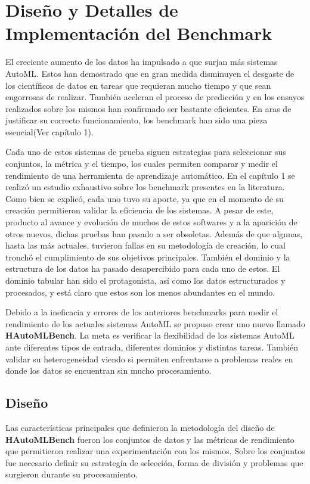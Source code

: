 \chapter{Diseño y Detalles de Implementación del Benchmark}\label{chapter:design}
El creciente aumento de los datos ha impulsado a que surjan más sistemas AutoML. Estos han demostrado que en gran medida disminuyen 
el desgaste de los científicos de datos en tareas que requieran mucho tiempo y que sean engorrosas de realizar. También aceleran 
el proceso de predicción y en los ensayos realizados sobre los mismos han confirmado ser bastante eficientes. En aras de justificar 
su correcto funcionamiento, los benchmark han sido una pieza esencial(Ver capítulo 1).

Cada uno de estos sistemas de prueba siguen estrategias para seleccionar sus conjuntos, la métrica y el tiempo, los cuales permiten 
comparar y medir el rendimiento de una herramienta de aprendizaje automático. En el capítulo 1 se realizó un estudio exhaustivo 
sobre los benchmark presentes en la literatura. Como bien se explicó, cada uno tuvo su aporte, ya que en el momento de su creación 
permitieron validar la eficiencia de los sistemas. A pesar de este, producto al avance y evolución de muchos de estos softwares y a 
la aparición de otros nuevos, dichas pruebas han pasado a ser obsoletas. Además de que algunas, hasta las más actuales, tuvieron 
fallas en su metodología de creación, lo cual tronchó el cumplimiento de sus objetivos principales. También el dominio y 
la estructura de los datos ha pasado desapercibido para cada uno de estos. El dominio tabular han sido el protagonista, 
así como los datos estructurados y procesados, y está claro que estos son los menos abundantes en el mundo.

Debido a la ineficacia y errores de los anteriores benchmarks para medir el rendimiento de los actuales sistemas AutoML se propuso 
crear uno nuevo llamado \textbf{HAutoMLBench}. La meta es verificar la flexibilidad de los sistemas AutoML ante diferentes tipos de entrada, 
diferentes dominios y distintas tareas. También validar su heterogeneidad viendo si permiten enfrentarse a problemas reales en donde 
los datos se encuentran sin mucho procesamiento.

\section{Diseño}\label{section:diseño}

Las características principales que definieron la metodología del diseño de \textbf{HAutoMLBench} fueron los conjuntos de datos y las métricas de 
rendimiento que permitieron realizar una experimentación con los mismos. Sobre los conjuntos fue necesario definir su estrategia de selección,
forma de división y problemas que surgieron durante su procesamiento.


